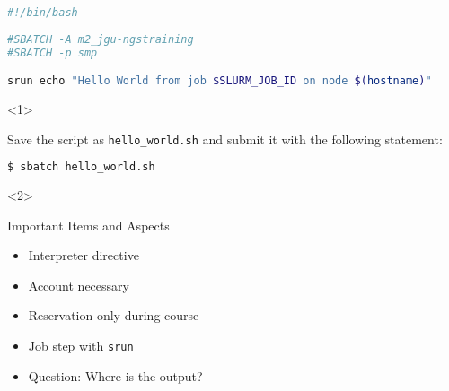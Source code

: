 \begin{frame}[fragile]
	\setcounter{handson}{\value{preframe_handson}}
	\frametitle{}
	\vspace{-2em}
	\begin{minipage}[t][0.32\textheight][t]{1.0\linewidth}
		\begin{lstlisting}[language=Bash, style=Shell, basicstyle=\scriptsize]
#!/bin/bash
			
#SBATCH -A m2_jgu-ngstraining
#SBATCH -p smp

srun echo "Hello World from job $SLURM_JOB_ID on node $(hostname)"
		\end{lstlisting}
	\end{minipage}\newline
	\begin{minipage}[t][0.3\textheight][t]{1.0\linewidth}
		\begin{onlyenv}<1>
			\begin{task}
				Save the script as \texttt{hello\_world.sh} and submit it with the following statement:
			\end{task}
			\begin{lstlisting}[language=Bash, style=Shell, basicstyle=\footnotesize]
$ sbatch hello_world.sh
			\end{lstlisting}
		\end{onlyenv}
		\begin{onlyenv}<2>
			\begin{block}{Important Items and Aspects}
				\begin{itemize}
					\item Interpreter directive
					\item Account necessary
					\item Reservation only during course
					\item Job step with \texttt{srun}
					\item Question: Where is the output?
				\end{itemize}
			\end{block}
		\end{onlyenv}
	\end{minipage}
	\vfill
\end{frame}